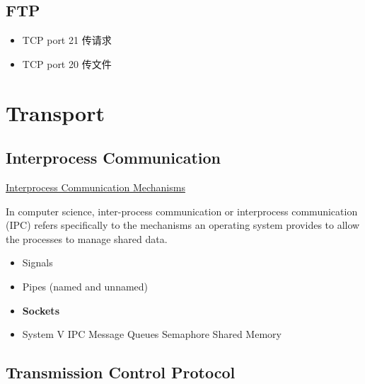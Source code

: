 \documentclass[a4paper]{report}
\begin{document}
\section{FTP}
\begin{itemize}
  \item TCP port 21 传请求
  \item TCP port 20 传文件
\end{itemize}

\chapter{Transport}
\section{Interprocess Communication}
\href{https://tldp.org/LDP/tlk/ipc/ipc.html}{Interprocess Communication Mechanisms}

In computer science, inter-process communication or interprocess communication (IPC) refers specifically to the mechanisms an operating system provides to allow the processes to manage shared data. 

\begin{itemize}
  \item Signals
  \item Pipes (named and unnamed)
  \item \textbf{Sockets}
  \item System V IPC
  \subitem Message Queues
  \subitem Semaphore
  \subitem Shared Memory
\end{itemize}
\section{Transmission Control Protocol}

\end{document}
